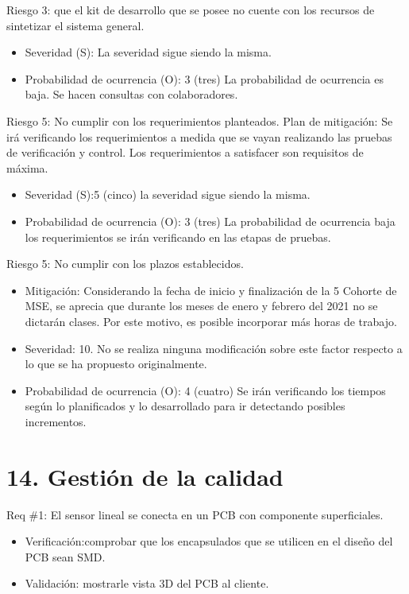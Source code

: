 \documentclass[
11pt, %
codirector, %
]{charter}
\begin{document}
Riesgo 3: que el kit de desarrollo que se posee no cuente con los recursos de sintetizar el sistema general.
\begin{itemize}
\item Severidad (S): La severidad sigue siendo la misma.       
\item Probabilidad de ocurrencia (O): 3 (tres) La probabilidad de ocurrencia es baja. Se hacen consultas con colaboradores.
\end{itemize}
  

Riesgo 5: No cumplir con los requerimientos planteados. Plan de mitigación: Se irá verificando los requerimientos a medida que se vayan realizando las pruebas de verificación y control. Los requerimientos a satisfacer son requisitos de máxima.
\begin{itemize}
\item Severidad (S):5 (cinco) la severidad sigue siendo la misma.
\item Probabilidad de ocurrencia (O): 3 (tres) La probabilidad de ocurrencia baja los requerimientos se irán verificando en las etapas de pruebas. 

\end{itemize}


Riesgo 5:  No cumplir con los plazos establecidos.
\begin{itemize}
\item Mitigación: Considerando la fecha de inicio y finalización de la 5 Cohorte de MSE, se aprecia que
durante los meses de enero y febrero del 2021 no se dictarán clases. Por este motivo, es
posible incorporar más horas de trabajo.
\item Severidad: 10. No se realiza ninguna modificación sobre este factor respecto a lo que se ha
propuesto originalmente.
\item Probabilidad de ocurrencia (O): 4 (cuatro) Se irán verificando los tiempos según lo planificados y lo desarrollado para ir detectando posibles incrementos.


\end{itemize}  


\section{14. Gestión de la calidad}
\label{sec:calidad}


Req \#1: El sensor lineal se conecta en un PCB con componente superficiales.
\begin{itemize}
\item Verificación:comprobar que los encapsulados que se utilicen en el diseño del PCB sean SMD.
\item Validación: mostrarle vista 3D del PCB al cliente.
\end{itemize}
\end{document}

